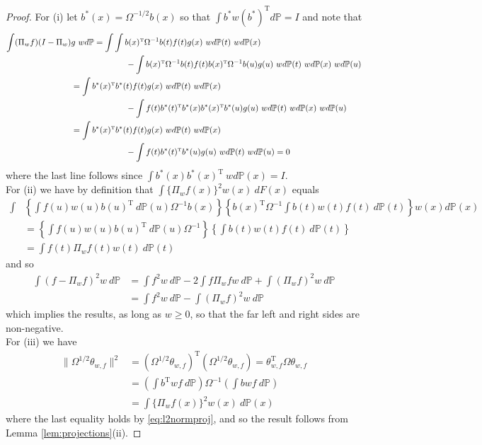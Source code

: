 \documentclass[11pt,twoside]{article}
\def\T{{ \mathrm{\scriptscriptstyle T} }}
\newcommand{\Pb}{\mathbb{P}}
\theoremstyle{definition}
\theoremstyle{remark}
\begin{document}
\medskip

\begin{proof}
For (i) let $b^*(x) = \Omega^{-1/2} b(x)$ so that $\int b^* w(b^*)^\T d\Pb = I$ and note that
\begin{align*}
\int ( \Pi_w f ) (I-\Pi_w) &g \ w d\Pb = \int \int b(x)^\T \Omega^{-1} b(t) f(t)g(x) \ wd\Pb(t) \ wd\Pb(x) \\
& \hspace{.9in} -  \int b(x)^\T \Omega^{-1} b(t) f(t) b(x)^\T \Omega^{-1}  b(u) g(u) \ wd\Pb(t) \ wd\Pb(x) \ wd\Pb(u) \\
&= \int b^*(x)^\T b^*(t) f(t) g(x) \ wd\Pb(t) \ wd\Pb(x) \\
& \hspace{.9in} -  \int f(t) b^*(t)^\T b^*(x) b^*(x)^\T  b^*(u) g(u) \ wd\Pb(t) \ wd\Pb(x) \ wd\Pb(u) \\
&= \int b^*(x)^\T b^*(t) f(t) g(x) \ wd\Pb(t) \ wd\Pb(x) \\
& \hspace{.9in} -  \int f(t) b^*(t)^\T  b^*(u) g(u) \ wd\Pb(t)  \ wd\Pb(u) = 0
\end{align*}
where the last line follows since $\int b^*(x) b^*(x)^\T \ wd\Pb(x) = I$. \\

For (ii) we have by definition that $\int \{\Pi_w f(x)\}^2 w(x) \ dF(x) $ equals
\begin{align}
 \int &\left\{ \int f(u) w(u) b(u)^\T \ d\Pb(u) \Omega^{-1} b(x) \right\} \left\{ b(x)^\T \Omega^{-1} \int b(t) w(t) f(t) \ d\Pb(t) \right\} w(x) d\Pb(x) \nonumber \\
&= \left\{ \int f(u) w(u) b(u)^\T \ d\Pb(u) \Omega^{-1} \right\} \left\{  \int b(t) w(t) f(t) \ d\Pb(t) \right\} \label{eq:l2normproj} \\
&= \int  f(t) \Pi_w f(t) w(t) \ d\Pb(t) \nonumber
\end{align}
and so
\begin{align*}
\int (f-\Pi_w f )^2 w \ d\Pb &= \int f^2 w \ d\Pb - 2 \int f \Pi_w f w \ d\Pb + \int (\Pi_w f)^2 w \ d\Pb  \\
&= \int f^2 w \ d\Pb -  \int (\Pi_w f)^2 w \ d\Pb 
\end{align*}
which implies the results, as long as $w \geq 0$, so that the far left and right sides are non-negative. \\

For (iii) we have
\begin{align*}
 \| \Omega^{1/2} \theta_{w,f} \|^2  &=  ( \Omega^{1/2} \theta_{w,f} )^\T (\Omega^{1/2} \theta_{w,f}) 
 =  \theta_{w,f}^\T \Omega \theta_{w,f} \\
 &= \left( \int b^\T w f \ d\Pb \right) \Omega^{-1}  \left( \int b w f \ d\Pb \right)  \\
 &= \int \{\Pi_w f(x)\}^2 w(x) \ d\Pb(x)
\end{align*}
where the last equality holds by \eqref{eq:l2normproj}, and so the result follows from Lemma \ref{lem:projections}(ii).
\end{proof}
\end{document}
